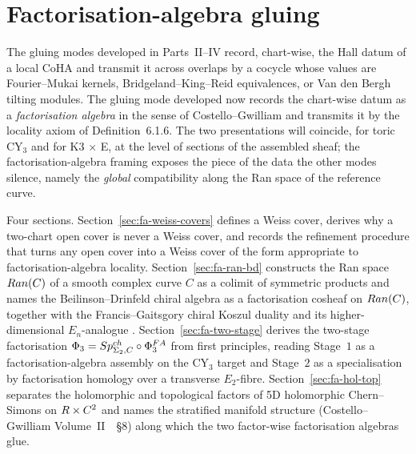 %
%
%

\part{Factorisation-algebra gluing}
\label{part:gluing-factorisation}

The gluing modes developed in Parts~II--IV record, chart-wise, the Hall
datum of a local CoHA and transmit it across overlaps by a cocycle whose
values are Fourier--Mukai kernels, Bridgeland--King--Reid equivalences,
or Van den Bergh tilting modules. The gluing mode developed now records
the chart-wise datum as a \emph{factorisation algebra} in the sense of
Costello--Gwilliam \cite{CostelloGwilliam,CostelloGwilliam2017} and
transmits it by the locality axiom of \cite{CostelloGwilliam2017}
Definition~6.1.6. The two presentations will coincide, for toric CY$_3$
and for K3 $\times$ E, at the level of sections of the assembled sheaf;
the factorisation-algebra framing exposes the piece of the data the
other modes silence, namely the \emph{global} compatibility along the
Ran space of the reference curve.

Four sections. Section~\ref{sec:fa-weiss-covers} defines a Weiss cover,
derives why a two-chart open cover is never a Weiss cover, and records
the refinement procedure that turns any open cover into a Weiss cover
of the form appropriate to factorisation-algebra locality.
Section~\ref{sec:fa-ran-bd} constructs the Ran space $Ran(C)$ of a
smooth complex curve $C$ as a colimit of symmetric products and names
the Beilinson--Drinfeld chiral algebra as a factorisation cosheaf on
$Ran(C)$, together with the Francis--Gaitsgory
\cite{FrancisGaitsgory2012} chiral Koszul duality and its
higher-dimensional $E_n$-analogue \cite{Francis2013}.
Section~\ref{sec:fa-two-stage} derives the two-stage factorisation
$\Phi_3 = Sp^{ch}_{\Sigma_2, C} \circ \Phi^{FA}_3$ from first principles,
reading Stage~$1$ as a factorisation-algebra assembly on the CY$_3$
target and Stage~$2$ as a specialisation by factorisation homology
over a transverse $E_2$-fibre. Section~\ref{sec:fa-hol-top} separates
the holomorphic and topological factors of 5D holomorphic Chern--Simons
on $R \times C^2$ and names the stratified manifold structure
(Costello--Gwilliam Volume~II~\cite{CostelloGwilliam2017}~\S8) along
which the two factor-wise factorisation algebras glue.

